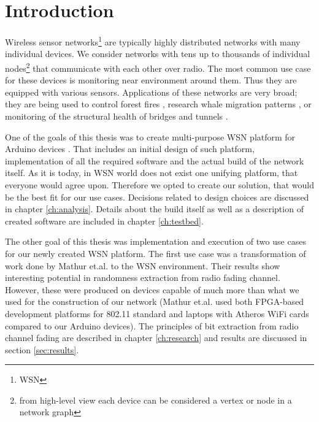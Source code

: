 \documentclass[
  print, %
  table,   %
  nolof,     %
  nolot,     %
           oneside
]{fithesis3}
\begin{document}

\chapter{Introduction}
Wireless sensor networks\footnote{WSN} are typically highly distributed networks with many individual devices. We consider networks with tens up to thousands of individual nodes\footnote{from high-level view each device can be considered a vertex or node in a network graph} that communicate with each other over radio. The most common use case for these devices is monitoring near environment around them. Thus they are equipped with various sensors. Applications of these networks are very broad; they are being used to control forest fires \cite{li2006wireless}, research whale migration patterns \cite{haas2006new}, or monitoring of the structural health of bridges and tunnels \cite{stajano2008steel}.

One of the goals of this thesis was to create multi-purpose WSN platform for Arduino devices \cite{Arduino}. That includes an initial design of such platform, implementation of all the required software and the actual build of the network itself. As it is today, in WSN world does not exist one unifying platform, that everyone would agree upon. Therefore we opted to create our solution, that would be the best fit for our use cases. Decisions related to design choices are discussed in chapter \ref{ch:analysis}. Details about the build itself as well as a description of created software are included in chapter \ref{ch:testbed}.

The other goal of this thesis was implementation and execution of two use cases for our newly created WSN platform. The first use case was a transformation of work done by Mathur et.al. \cite{Mathur2008Rssi} to the WSN environment. Their results show interesting potential in randomness extraction from radio fading channel. However, these were produced on devices capable of much more than what we used for the construction of our network (Mathur et.al. used both FPGA-based development platforms for 802.11 standard and laptops with Atheros WiFi cards compared to our Arduino devices). The principles of bit extraction from radio channel fading are described in chapter \ref{ch:research} and results are discussed in section \ref{sec:results}.
\end{document}
